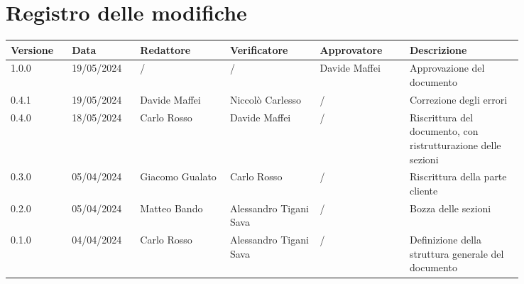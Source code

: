 \section*{Registro delle modifiche}
 {
  \scriptsize
  \begin{tabular}{p{0.10\linewidth}p{0.10\linewidth}p{0.15\linewidth}p{0.15\linewidth}p{0.15\linewidth}p{0.19\linewidth}}
	  \textbf{Versione} & \textbf{Data} & \textbf{Redattore}     & \textbf{Verificatore} & \textbf{Approvatore} & \textbf{Descrizione} \\
	  \hline
	  1.0.0				& 19/05/2024	&			/			&			/			& Davide Maffei			& Approvazione del documento \\
	  \hline 
	  0.4.1 			& 19/05/2024	& Davide Maffei		& Niccolò Carlesso             &         /               & Correzione degli errori                                                        \\
	  \hline
	  0.4.0             & 18/05/2024    & Carlo Rosso	&	Davide Maffei					&		/			& Riscrittura del documento, con ristrutturazione delle sezioni \\
	  \hline
	  0.3.0             & 05/04/2024    & Giacomo Gualato & Carlo Rosso						&		/			& Riscrittura della parte cliente \\
	  \hline
	  0.2.0             & 05/04/2024    & Matteo Bando & Alessandro Tigani Sava				&        /       	& Bozza delle sezioni \\ 
	  \hline
	  0.1.0             & 04/04/2024    & Carlo Rosso & Alessandro Tigani Sava              &        /       	& Definizione della struttura generale del documento \\
	\hline
	\end{tabular}
 }
